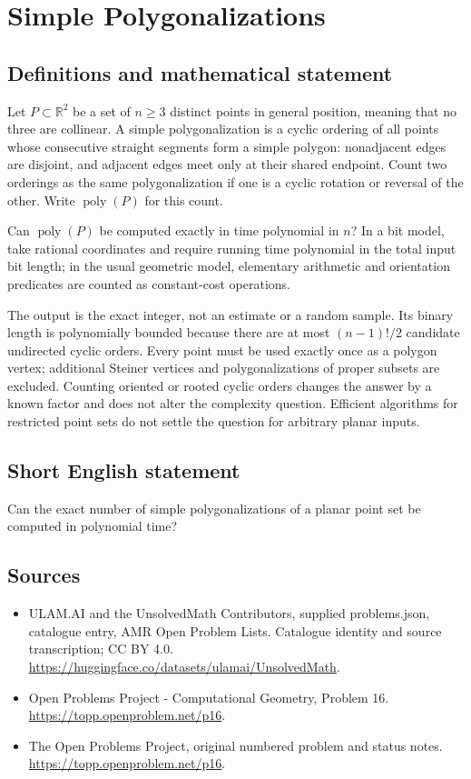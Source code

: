 \documentclass[11pt,a4paper]{article}
\begin{document}
\section*{Simple Polygonalizations}\label{statement}

\subsection{Definitions and mathematical statement}
Let $P\subset\mathbb R^2$ be a set of $n\ge3$ distinct points
in general position, meaning that no three are collinear.
A simple polygonalization is a cyclic ordering of all points
whose consecutive straight segments form a simple polygon:
nonadjacent edges are disjoint, and adjacent edges meet only
at their shared endpoint. Count two orderings as the same
polygonalization if one is a cyclic rotation or reversal of
the other. Write $\operatorname{poly}(P)$ for this count.

Can $\operatorname{poly}(P)$ be computed exactly in time polynomial
in $n$? In a bit model, take rational coordinates and require
running time polynomial in the total input bit length; in the
usual geometric model, elementary arithmetic and orientation
predicates are counted as constant-cost operations.

The output is the exact integer, not an estimate or a random
sample. Its binary length is polynomially bounded because there
are at most $(n-1)!/2$ candidate undirected cyclic orders.
Every point must be used exactly once as a polygon vertex;
additional Steiner vertices and polygonalizations of proper
subsets are excluded. Counting oriented or rooted cyclic orders
changes the answer by a known factor and does not alter the
complexity question. Efficient algorithms for restricted point
sets do not settle the question for arbitrary planar inputs.
\subsection{Short English statement}
Can the exact number of simple polygonalizations of a planar point set be computed in polynomial time?
\subsection{Sources}
\begin{itemize}
\item[S1] ULAM.AI and the UnsolvedMath Contributors, supplied problems.json, catalogue entry, AMR Open Problem Lists. Catalogue identity and source transcription; CC BY 4.0.
\url{https://huggingface.co/datasets/ulamai/UnsolvedMath}.
\item[S2] Open Problems Project - Computational Geometry, Problem 16. 
\url{https://topp.openproblem.net/p16}.
\item[S3] The Open Problems Project, original numbered problem and status notes.
\url{https://topp.openproblem.net/p16}.
\end{itemize}
\end{document}
